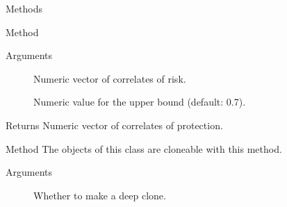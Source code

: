 \documentclass[a4paper]{book}
\begin{document}
\begin{Section}{Methods}
\begin{SubSection}{Method }
\begin{SubSubSection}{Arguments}
\begin{description}
\item[] Numeric vector of correlates of risk.

\item[] Numeric value for the upper bound (default: 0.7).

\end{description}


\end{SubSubSection}

%
\begin{SubSubSection}{Returns}
Numeric vector of correlates of protection.
\end{SubSubSection}

\end{SubSection}



\hypertarget{method-SeroCOP-clone}{}
%
\begin{SubSection}{Method }
The objects of this class are cloneable with this method.
%


%
\begin{SubSubSection}{Arguments}

\begin{description}

\item[] Whether to make a deep clone.

\end{description}


\end{SubSubSection}

\end{SubSection}

\end{Section}
%
\end{document}
